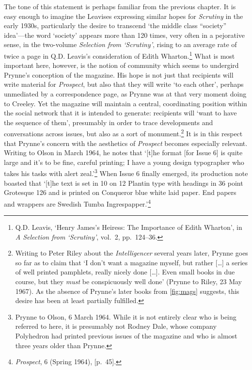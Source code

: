 \documentclass[]{article}
\begin{document}
The tone of this statement is perhaps familiar from the previous
chapter. It is easy enough to imagine the Leavises expressing similar
hopes for \emph{Scrutiny} in the early 1930s, particularly the desire to
transcend ‘the middle class “society” idea’—the word ‘society’ appears
more than 120 times, very often in a pejorative sense, in the two-volume
\emph{Selection from ‘Scrutiny’}, rising to an average rate of twice a
page in Q.D. Leavis’s consideration of Edith Wharton.\footnote{Q.D.
  Leavis, ‘Henry James’s Heiress: The Importance of Edith Wharton’, in
  \emph{A Selection from ‘Scrutiny’}, vol.~2, pp.~124–36.} What is most
important here, however, is the notion of community which seems to
undergird Prynne’s conception of the magazine. His hope is not just that
recipients will write material for \emph{Prospect}, but also that they
will write ‘to each other’, perhaps unmediated by a correspondence page,
as Prynne was at that very moment doing to Creeley. Yet the magazine
will maintain a central, coordinating position within the social network
that it is intended to generate: recipients will ‘want to have the
sequence of them’, presumably in order to trace developments and
conversations across issues, but also as a sort of monument.\footnote{Writing
  to Peter Riley about the \emph{Intelligencer} several years later,
  Prynne goes so far as to claim that ‘I don’t want a magazine myself,
  but rather {[}\ldots{}{]} a series of well printed pamphlets, really
  nicely done {[}\ldots{}{]}. Even small books in due course, but they
  \emph{must} be conspicuously well done’ (Prynne to Riley, 23 May
  1967). As the absence of Prynne’s later books from \ref{fig:mags}
  suggests, this desire has been at least partially fulfilled.} It is in
this respect that Prynne’s concern with the aesthetics of
\emph{Prospect} becomes especially relevant. Writing to Olson in March
1964, he notes that ‘{[}t{]}he format {[}for Issue 6{]} is quite large
and it’s to be fine, careful printing; I have a young design typographer
who takes his tasks with alert zeal.’\footnote{Prynne to Olson, 6 March
  1964. While it is not entirely clear who is being referred to here, it
  is presumably not Rodney Dale, whose company Polyhedron had printed
  previous issues of the magazine and who is almost three years older
  than Prynne.} When Issue 6 finally emerged, its production note
boasted that ‘{[}t{]}he text is set in 10 on 12 Plantin type with
headings in 36 point Grotesque 126 and is printed on Conqueror blue
white laid paper. End papers and wrappers are Swedish Tumba
Ingrespapper.’\footnote{\emph{Prospect}, 6 (Spring 1964), {[}p.~45{]}.}
\end{document}
